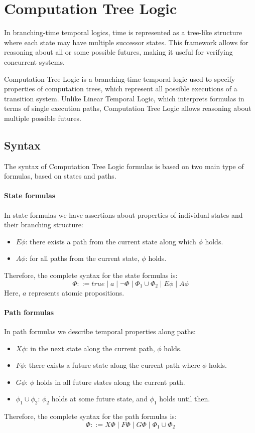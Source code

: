\section{Computation Tree Logic}

In branching-time temporal logics, time is represented as a tree-like structure where each state may have multiple successor states. 
This framework allows for reasoning about all or some possible futures, making it useful for verifying concurrent systems.

Computation Tree Logic is a branching-time temporal logic used to specify properties of computation trees, which represent all possible executions of a transition system. 
Unlike Linear Temporal Logic, which interprets formulas in terms of single execution paths, Computation Tree Logic allows reasoning about multiple possible futures.

\subsection{Syntax}
The syntax of Computation Tree Logic formulas is based on two main type of formulas, based on states and paths. 

\paragraph*{State formulas}
In state formulas we have assertions about properties of individual states and their branching structure: 
\begin{itemize}
    \item $E\phi$: there exists a path from the current state along which $\phi$ holds.
    \item $A\phi$: for all paths from the current state, $\phi$ holds.
\end{itemize}
\noindent Therefore, the complete syntax for the state formulas is:
\[\Phi ::= true \mid a \mid \lnot \Phi \mid \Phi_1\cup \Phi_2 \mid E\phi \mid A\phi\]
\noindent Here, $a$ represents atomic propositions.

\paragraph*{Path formulas}
In path formulas we describe temporal properties along paths: 
\begin{itemize}
    \item $X\phi$: in the next state along the current path, $\phi$ holds.
    \item $F\phi$: there exists a future state along the current path where $\phi$ holds.
    \item $G\phi$: $\phi$ holds in all future states along the current path.
    \item $\phi_1 \cup \phi_2$: $\phi_2$ holds at some future state, and $\phi_1$ holds until then.
\end{itemize}
\noindent Therefore, the complete syntax for the path formulas is:
\[\Phi ::= X \Phi \mid F\Phi\mid G\Phi \mid\Phi_1\cup\Phi_2\]

